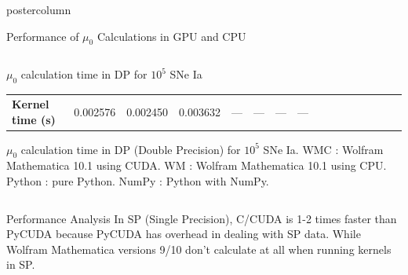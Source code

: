 \documentclass[final,hyperref={pdfpagelabels=false}]{beamer}
\newlength{\columnheight}
\begin{document}
\begin{frame}
\begin{columns}
\begin{column}{.49\textwidth}
\begin{beamercolorbox}[center,wd=\textwidth]{postercolumn}
\begin{minipage}[T]{.95\textwidth}
{\begin{block}{Performance of $\mu_0$ Calculations in GPU and CPU}
\begin{columns}
\begin{column}{.95\textwidth}
\begin{exampleblock}{$\mu_0$ calculation time in DP for $10^5$ SNe Ia}
\begin{table}
\begin{tabular}{@{} p{.17\linewidth} | p{.10\linewidth} p{.12\linewidth} p{.10\linewidth} p{.10\linewidth} p{.10\linewidth} p{.10\linewidth} p{.08\linewidth} r r r r r r r r @{}}
                   	  \toprule \textbf{Kernel time (s)} & 0.002576 & 0.002450 & 0.003632 & --- & --- & --- & --- \\ 
                    \end{tabular} 
                  \end{table}
                \end{exampleblock}
                {\small $\mu_0$ calculation time in DP (Double Precision) for $10^5$ SNe Ia. WMC : Wolfram Mathematica 10.1 using CUDA. WM : Wolfram Mathematica 10.1 using CPU. Python : pure Python. NumPy : Python with NumPy. }
              \end{column}                                
            \end{columns}
          \end{block}
            \vspace{.005\columnheight}
            \begin{block}{Performance Analysis}
               In SP (Single Precision), C/CUDA is 1-2 times faster than PyCUDA because PyCUDA has overhead in dealing with SP data. While Wolfram Mathematica versions 9/10 don't calculate at all when running kernels in SP.
               

\end{block}}
\end{minipage}
\end{beamercolorbox}
\end{column}
\end{columns}
\end{frame}
\end{document}
